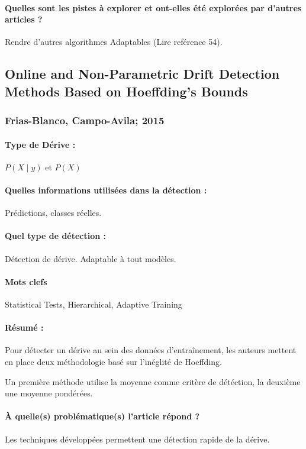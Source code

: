 \documentclass[11pt,a4paper]{report}
\begin{document}
\paragraph{Quelles sont les pistes à explorer et ont-elles  été explorées par d'autres articles ?} Rendre d'autres algorithmes Adaptables (Lire  reférence 54).








\subsection{Online and Non-Parametric Drift Detection Methods Based on Hoeffding’s Bounds}
\subsubsection{Frias-Blanco, Campo-Avila; 2015}

\paragraph{Type de Dérive :} $P(X\mid y)$ et $P(X)$
\paragraph{Quelles informations utilisées dans la détection :} Prédictions, classes réelles.
\paragraph{Quel type de détection :} Détection de dérive. Adaptable à tout modèles.

\paragraph{Mots clefs} Statistical Tests, Hierarchical, Adaptive Training

\paragraph{Résumé :} Pour détecter un dérive au sein des données d'entraînement, les auteurs mettent en place deux méthodologie basé sur l'inéglité de Hoeffding.

Un première méthode utilise la moyenne comme critère de détéction, la deuxième une moyenne pondérées.

\paragraph{À quelle(s) problématique(s) l'article répond ?} Les techniques développées permettent une détection rapide de la dérive. 
\end{document}
